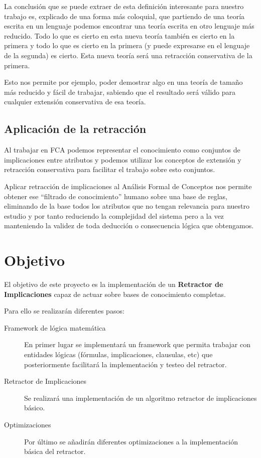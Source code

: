 	La conclusión que se puede extraer de esta definición interesante para nuestro trabajo es, explicado de una forma más coloquial, que partiendo de una teoría escrita en un lenguaje podemos encontrar una teoría escrita en otro lenguaje más reducido. Todo lo que es cierto en esta nueva teoría también es cierto en la primera y todo lo que es cierto en la primera (y puede expresarse en el lenguaje de la segunda) es cierto. Esta nueva teoría será una retracción conservativa de la primera.

	Esto nos permite por ejemplo, poder demostrar algo en una teoría de tamaño más reducido y fácil de trabajar, sabiendo que el resultado será válido para cualquier extensión conservativa de esa teoría.


\subsection*{Aplicación de la retracción}
	
	Al trabajar en FCA podemos representar el conocimiento como conjuntos de implicaciones entre atributos y podemos utilizar los conceptos de extensión y retracción conservativa para facilitar el trabajo sobre esto conjuntos.
	
	Aplicar retracción de implicaciones al Análisis Formal de Conceptos nos permite obtener ese ``filtrado de conocimiento'' humano sobre una base de reglas, eliminando de la base todos los atributos que no tengan relevancia para nuestro estudio y por tanto reduciendo la complejidad del sistema pero a la vez manteniendo la validez de toda deducción o consecuencia lógica que obtengamos.
	
 
\section*{Objetivo}

	El objetivo de este proyecto es la implementación de un \textbf{Retractor de Implicaciones} capaz de actuar sobre bases
	de conocimiento completas.
	
	Para ello se realizarán diferentes pasos:

	\begin{description}
	
		\item[Framework de lógica matemática]
		En primer lugar se implementará un framework que permita trabajar con entidades lógicas (fórmulas, implicaciones, clausulas, etc)
		que posteriormente facilitará la implementación y testeo del retractor.
		
		\item[Retractor de Implicaciones]
		Se realizará una implementación de un algoritmo retractor de implicaciones básico.
		
		\item[Optimizaciones]
		Por último se añadirán diferentes optimizaciones a la implementación básica del retractor.
	
	\end{description}

